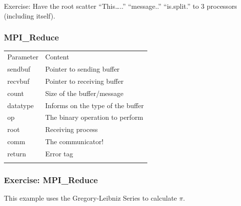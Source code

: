 Exercise: Have the root scatter ``This\ldots{}..'' ``message..''
``is.split.'' to 3 processors (including itself).

\subsubsection{MPI\_Reduce}\label{mpiux5freduce}

\begin{Shaded}
\begin{Highlighting}[]
     
                
\end{Highlighting}
\end{Shaded}

\begin{longtable}[c]{@{}ll@{}}
\toprule\addlinespace
Parameter & Content
\\\addlinespace
\midrule\endhead
sendbuf & Pointer to sending buffer
\\\addlinespace
recvbuf & Pointer to receiving buffer
\\\addlinespace
count & Size of the buffer/message
\\\addlinespace
datatype & Informs on the type of the buffer
\\\addlinespace
op & The binary operation to perform
\\\addlinespace
root & Receiving process
\\\addlinespace
comm & The communicator!
\\\addlinespace
return & Error tag
\\\addlinespace
\bottomrule
\end{longtable}

\subsubsection{Exercise: MPI\_Reduce}\label{exercise-mpiux5freduce}

This example uses the Gregory-Leibniz Series to calculate $\pi$.

